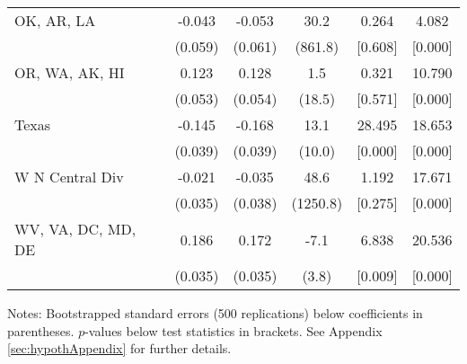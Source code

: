 \begin{landscape}
\begin{table}[ht]
{\begin{threeparttable}
\begin{tabular}{lccccc}
OK, AR, LA & -0.043 & -0.053 & 30.2 & 0.264 & 4.082 \\ 
 & (0.059) & (0.061) & (861.8) & [0.608] & [0.000] \\ 
OR, WA, AK, HI & 0.123 & 0.128 & 1.5 & 0.321 & 10.790 \\ 
 & (0.053) & (0.054) & (18.5) & [0.571] & [0.000] \\ 
Texas & -0.145 & -0.168 & 13.1 & 28.495 & 18.653 \\ 
 & (0.039) & (0.039) & (10.0) & [0.000] & [0.000] \\ 
W N Central Div & -0.021 & -0.035 & 48.6 & 1.192 & 17.671 \\ 
 & (0.035) & (0.038) & (1250.8) & [0.275] & [0.000] \\ 
WV, VA, DC, MD, DE & 0.186 & 0.172 & -7.1 & 6.838 & 20.536 \\ 
 & (0.035) & (0.035) & (3.8) & [0.009] & [0.000] \\ 
\bottomrule
\end{tabular}
{\footnotesize {\raggedright Notes: Bootstrapped standard errors (500 replications) below coefficients in parentheses. $p$-values below test statistics in brackets. See Appendix \ref{sec:hypothAppendix} for further details.}}
\end{threeparttable}
}
\end{table}
\end{landscape}
